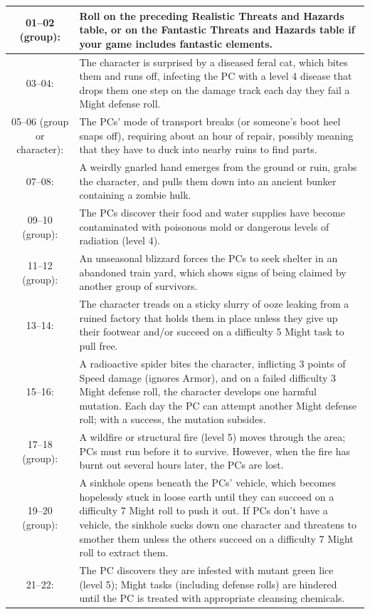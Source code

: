 \begin{longtable}{| c | p{12cm} |}
01–02 (group): & Roll on the preceding Realistic Threats and Hazards table, or on the Fantastic Threats and Hazards table if your game includes fantastic elements. \\ \hline
03–04: & The character is surprised by a diseased feral cat, which bites them and runs off, infecting the PC with a level 4 disease that drops them one step on the damage track each day they fail a Might defense roll. \\ \hline
05–06 (group or character): &  The PCs’ mode of transport breaks (or someone’s boot heel snaps off), requiring about an hour of repair, possibly meaning that they have to duck into nearby ruins to find parts. \\ \hline
07–08: & A weirdly gnarled hand emerges from the ground or ruin, grabs the character, and pulls them down into an ancient bunker containing a zombie hulk. \\ \hline
09–10 (group): & The PCs discover their food and water supplies have become contaminated with poisonous mold or dangerous levels of radiation (level 4). \\ \hline
11–12 (group): & An unseasonal blizzard forces the PCs to seek shelter in an abandoned train yard, which shows signs of being claimed by another group of survivors. \\ \hline
13–14: & The character treads on a sticky slurry of ooze leaking from a ruined factory that holds them in place unless they give up their footwear and/or succeed on a difficulty 5 Might task to pull free. \\ \hline
15–16: &  A radioactive spider bites the character, inflicting 3 points of Speed damage (ignores Armor), and on a failed difficulty 3 Might defense roll, the character develops one harmful mutation. Each day the PC can attempt another Might defense roll; with a success, the mutation subsides. \\ \hline
17–18 (group): & A wildfire or structural fire (level 5) moves through the area; PCs must run before it to survive. However, when the fire has burnt out several hours later, the PCs are lost. \\ \hline
19–20 (group): & A sinkhole opens beneath the PCs’ vehicle, which becomes hopelessly stuck in loose earth until they can succeed on a difficulty 7 Might roll to push it out. If PCs don’t have a vehicle, the sinkhole sucks down one character and threatens to smother them unless the others succeed on a difficulty 7 Might roll to extract them. \\ \hline
21–22: & The PC discovers they are infested with mutant green lice (level 5); Might tasks (including defense rolls) are hindered until the PC is treated with appropriate cleansing chemicals. \\ \hline

\end{longtable}
